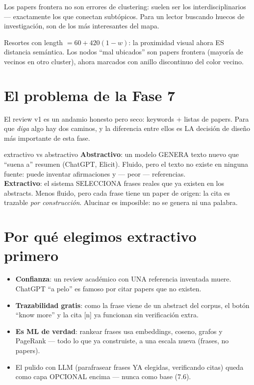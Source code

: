 \documentclass[11pt,a4paper]{article}
\begin{document}
\begin{ojo}
Los papers frontera no son errores de clustering: suelen ser los interdisciplinarios —
exactamente los que conectan subtópicos. Para un lector buscando huecos de
investigación, son de los más interesantes del mapa.
\end{ojo}

\begin{resumen}
Resortes con length $= 60 + 420(1-w)$: la proximidad visual ahora ES distancia
semántica. Los nodos ``mal ubicados'' son papers frontera (mayoría de vecinos en otro
cluster), ahora marcados con anillo discontinuo del color vecino.
\end{resumen}
\clearpage
{}
{}

\section{El problema de la Fase 7}

El review v1 es un andamio honesto pero seco: keywords + listas de papers. Para que
\emph{diga} algo hay dos caminos, y la diferencia entre ellos es LA decisión de diseño
más importante de esta fase.

\begin{concepto}{extractivo vs abstractivo}
\textbf{Abstractivo}: un modelo GENERA texto nuevo que ``suena a'' resumen (ChatGPT,
Elicit). Fluido, pero el texto no existe en ninguna fuente: puede inventar afirmaciones
y --- peor --- referencias. \\
\textbf{Extractivo}: el sistema SELECCIONA frases reales que ya existen en los abstracts.
Menos fluido, pero cada frase tiene un paper de origen: la cita es trazable
\emph{por construcción}. Alucinar es imposible: no se genera ni una palabra.
\end{concepto}

\section{Por qué elegimos extractivo primero}

\begin{itemize}
  \item \textbf{Confianza}: un review académico con UNA referencia inventada muere.
        ChatGPT ``a pelo'' es famoso por citar papers que no existen.
  \item \textbf{Trazabilidad gratis}: como la frase viene de un abstract del corpus,
        el botón ``know more'' y la cita [n] ya funcionan sin verificación extra.
  \item \textbf{Es ML de verdad}: rankear frases usa embeddings, coseno, grafos y
        PageRank --- todo lo que ya construiste, a una escala nueva (frases, no papers).
  \item El pulido con LLM (parafrasear frases YA elegidas, verificando citas) queda como
        capa OPCIONAL encima --- nunca como base (7.6).
\end{itemize}
\end{document}
